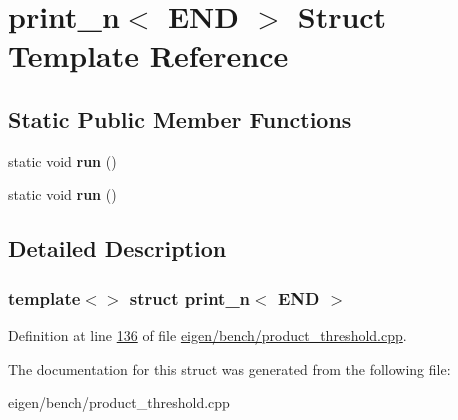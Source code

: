 \hypertarget{structprint__n_3_01_e_n_d_01_4}{}\section{print\+\_\+n$<$ E\+ND $>$ Struct Template Reference}
\label{structprint__n_3_01_e_n_d_01_4}
\subsection*{Static Public Member Functions}
\begin{DoxyCompactItemize}
\item 
\mbox{\label{structprint__n_3_01_e_n_d_01_4_a1814bc7a266fc0f0fed5e98e7dc716bd}} 
static void {\bfseries run} ()
\item 
\mbox{\label{structprint__n_3_01_e_n_d_01_4_a1814bc7a266fc0f0fed5e98e7dc716bd}} 
static void {\bfseries run} ()
\end{DoxyCompactItemize}


\subsection{Detailed Description}
\subsubsection*{template$<$$>$\newline
struct print\+\_\+n$<$ E\+N\+D $>$}



Definition at line \hyperlink{eigen_2bench_2product__threshold_8cpp_source_l00136}{136} of file \hyperlink{eigen_2bench_2product__threshold_8cpp_source}{eigen/bench/product\+\_\+threshold.\+cpp}.



The documentation for this struct was generated from the following file\+:\begin{DoxyCompactItemize}
\item 
eigen/bench/product\+\_\+threshold.\+cpp\end{DoxyCompactItemize}
